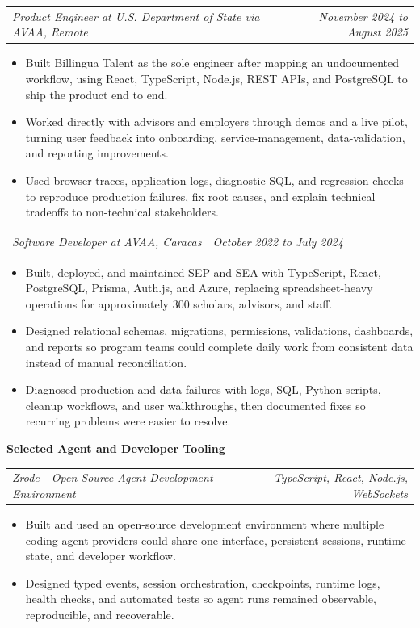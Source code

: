 \documentclass[10pt,letterpaper]{article}
\makeatletter
\newcommand{\bodyfont}{\fontsize{10.5}{15.75}\selectfont}
\newcommand{\sectiontitle}[1]{%
  \vspace{4pt}
  {\bodyfont\textbf{#1}}\par
  \nopagebreak[4]
  \vspace{2pt}
}
\newcommand{\roleline}[2]{%
  \begin{tabularx}{\textwidth}{@{}Xr@{}}
    \bodyfont\textit{#1} & \bodyfont\textit{#2}
  \end{tabularx}
  \nopagebreak[4]
  \vspace{1pt}
}
\makeatother
\begin{document}
\vspace{3pt}
\roleline{Product Engineer at U.S. Department of State via AVAA, Remote}{November 2024 to August 2025}
\begin{itemize}
  \item Built Billingua Talent as the sole engineer after mapping an undocumented workflow, using React, TypeScript, Node.js, REST APIs, and PostgreSQL to ship the product end to end.
  \item Worked directly with advisors and employers through demos and a live pilot, turning user feedback into onboarding, service-management, data-validation, and reporting improvements.
  \item Used browser traces, application logs, diagnostic SQL, and regression checks to reproduce production failures, fix root causes, and explain technical tradeoffs to non-technical stakeholders.
\end{itemize}

\roleline{Software Developer at AVAA, Caracas}{October 2022 to July 2024}
\begin{itemize}
  \item Built, deployed, and maintained SEP and SEA with TypeScript, React, PostgreSQL, Prisma, Auth.js, and Azure, replacing spreadsheet-heavy operations for approximately 300 scholars, advisors, and staff.
  \item Designed relational schemas, migrations, permissions, validations, dashboards, and reports so program teams could complete daily work from consistent data instead of manual reconciliation.
  \item Diagnosed production and data failures with logs, SQL, Python scripts, cleanup workflows, and user walkthroughs, then documented fixes so recurring problems were easier to resolve.
\end{itemize}

\sectiontitle{Selected Agent and Developer Tooling}

\roleline{Zrode - Open-Source Agent Development Environment}{TypeScript, React, Node.js, WebSockets}
\begin{itemize}
  \item Built and used an open-source development environment where multiple coding-agent providers could share one interface, persistent sessions, runtime state, and developer workflow.
  \item Designed typed events, session orchestration, checkpoints, runtime logs, health checks, and automated tests so agent runs remained observable, reproducible, and recoverable.
\end{itemize}
\end{document}
